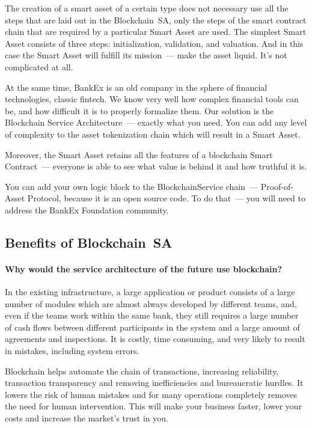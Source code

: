 \documentclass{article}
\begin{document}
\begin{multicols}{2}
The creation of a smart asset of a certain type does not necessary use all the steps that are laid out in the Blockchain~SA, only the steps of the smart contract chain that are required by a particular Smart Asset are used. The simplest Smart Asset consists of three steps: initialization, validation, and valuation. And in this case the Smart Asset will fulfill its mission~--- make the asset liquid. It’s not complicated at all. 

At the same time, BankEx is an old company in the sphere of financial technologies, classic fintech. We know very well how complex financial tools can be, and how difficult it is to properly formalize them. Our solution is the Blockchain Service Architecture~--- exactly what you need. You can add any level of complexity to the asset tokenization chain which will result in a Smart Asset.

Moreover, the Smart Asset retains all the features of a blockchain Smart Contract~--- everyone is able to see what value is behind it and how truthful it is. 

You can add your own logic block to the BlockchainService chain~--- Proof-of-Asset Protocol, because it is an open source code. To do that~--- you will need to address the BankEx Foundation community.

\subsection{Benefits of Blockchain~SA}

\paragraph*{Why would the service architecture of the future use blockchain?} In the existing infrastructure, a large application or product consists of a large number of modules which are almost always developed by different teams, and, even if the teams work within the same bank, they still requires a large number of cash flows between different participants in the system and a large amount of agreements and inspections. It is costly, time consuming, and very likely to result in mistakes, including system errors.

Blockchain helps automate the chain of transactions, increasing reliability, transaction transparency and removing inefficiencies and bureaucratic hurdles. It lowers the risk of human mistakes and for many operations completely removes the need for human intervention. This will make your business faster, lower your costs and increase the market's trust in you.


\end{multicols}
\end{document}
